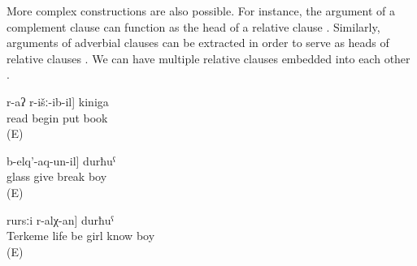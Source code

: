 More complex constructions are also possible. For instance, the argument of a complement clause can function as the head of a relative clause . Similarly, arguments of adverbial clauses can be extracted in order to serve as heads of relative clauses . We can have multiple relative clauses embedded into each other . 
%
\begin{exe}
	\ex	\label{ex:the book that I (fem.) started to read}
	\gll	[du	[b-elč'-ij]	r-aʔ	r-išː-ib-il]	kiniga\\
			read	\tsc{f-}begin	put	book\\
	\glt	{} (E)

	\ex	\label{ex:the boy who broke the glass after I gave it to him}
	\gll	[[du-l	istikan	b-ičː-ib-le]	b-elq'-aq-un-il]	durħuˁ\\
			glass	give	break	boy\\
	\glt	{} (E)

	\ex	\label{ex:the boy who know the girl who lives in Terkeme}
	\gll	[[Tarkama-le-r	er	r-irχʷ-an]	rursːi	r-alχ-an]	durħuˁ\\
		Terkeme	life	be	girl	know	boy\\
	\glt	{} (E)
\end{exe}

